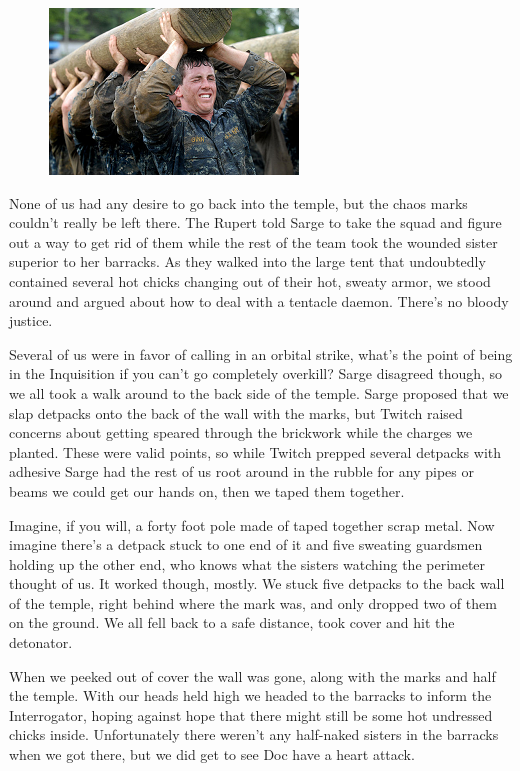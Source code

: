 \begin{figure}
	\begin{center}
		\includegraphics[width=\figwidth]{pics/6/9.png}
	\end{center}
\end{figure}
None of us had any desire to go back into the temple, but the chaos marks couldn't really be left there. 
The Rupert told Sarge to take the squad and figure out a way to get rid of them while the rest of the team took the wounded sister superior to her barracks. 
As they walked into the large tent that undoubtedly contained several hot chicks changing out of their hot, sweaty armor, we stood around and argued about how to deal with a tentacle daemon. 
There's no bloody justice.

Several of us were in favor of calling in an orbital strike, what's the point of being in the Inquisition if you can't go completely overkill? 
Sarge disagreed though, so we all took a walk around to the back side of the temple. 
Sarge proposed that we slap detpacks onto the back of the wall with the marks, but Twitch raised concerns about getting speared through the brickwork while the charges we planted. 
These were valid points, so while Twitch prepped several detpacks with adhesive Sarge had the rest of us root around in the rubble for any pipes or beams we could get our hands on, then we taped them together. 

Imagine, if you will, a forty foot pole made of taped together scrap metal. 
Now imagine there's a detpack stuck to one end of it and five sweating guardsmen holding up the other end, who knows what the sisters watching the perimeter thought of us. 
It worked though, mostly. 
We stuck five detpacks to the back wall of the temple, right behind where the mark was, and only dropped two of them on the ground. 
We all fell back to a safe distance, took cover and hit the detonator.

When we peeked out of cover the wall was gone, along with the marks and half the temple. 
With our heads held high we headed to the barracks to inform the Interrogator, hoping against hope that there might still be some hot undressed chicks inside. 
Unfortunately there weren't any half-naked sisters in the barracks when we got there, but we did get to see Doc have a heart attack.

